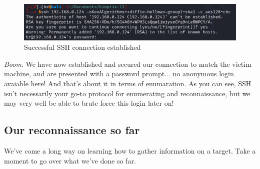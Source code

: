 \documentclass[a4paper,11pt]{article}
\begin{document}
\begin{figure}[h]
    \centering
    \includegraphics[width=1\textwidth]{images/sshk.png}
    \caption{Successful SSH connection established}
    \label{fig:sshk}
\end{figure}

\textit{Boom}. We have now established and secured our connection to match the victim machine, and are presented with a password prompt... no anonymous login avaiable here! And that's about it in terms of enumaration. As you can see, SSH isn't necessarily your go-to protocol for enumerating and reconnaissance, but we may very well be able to brute force this login later on!
\pagebreak
        
\subsection{Our reconnaissance so far}

We've come a long way on learning how to gather information on a target. Take a moment to go over what we've done so far.
\end{document}
